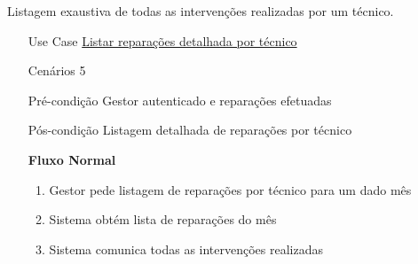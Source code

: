 \documentclass[../relatorio.tex]{subfiles}
\begin{document}
Listagem exaustiva de todas as intervenções realizadas por um técnico.
\begin{itemize}
    \item[Use Case] {\underline{Listar reparações detalhada por técnico}}
    \item[Cenários] {5}
    \item[Pré-condição] {Gestor autenticado e reparações efetuadas}
    \item[Pós-condição] {Listagem detalhada de reparações por técnico}
          \begin{flushleft}
              \textbf{Fluxo Normal} 
          \end{flushleft}
          \begin{enumerate}
              \item Gestor pede listagem de reparações por técnico para um dado mês %
              \item Sistema obtém lista de reparações do mês %
              \item Sistema comunica todas as intervenções realizadas %
          \end{enumerate}
\end{itemize}
\end{document}
